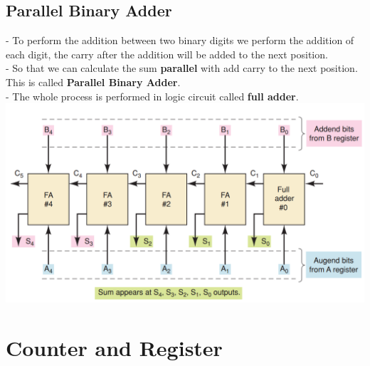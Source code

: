 \documentclass[12pt]{article}
\begin{document}
\subsection{Parallel Binary Adder}
- To perform the addition between two binary digits we perform the addition of each digit, the carry after the addition will be added to the next position. \\
- So that we can calculate the sum \textbf{parallel} with add carry to the next position. This is called \textbf{Parallel Binary Adder}. \\
- The whole process is performed in logic circuit called \textbf{full adder}. \\
\includegraphics[scale = 0.6]{hinh37}

\section{Counter and Register}
\end{document}
